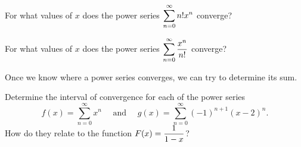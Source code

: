 \newpage

\begin{example}
For what values of $x$ does the power series $\displaystyle\sum_{n=0}^\infty n!x^n$ converge?
\end{example}

\ifdefined\SOLUTION
{}
\fi

\newpage

\begin{example}
For what values of $x$ does the power series $\displaystyle\sum_{n=0}^\infty \frac{x^n}{n!}$ converge?
\end{example}

\ifdefined\SOLUTION
{}
\fi
\newpage

\begin{remark}
Once we know where a power series converges, we can try to determine its sum.
\end{remark}

\begin{example}
Determine the interval of convergence for each of the power series
\begin{equation*}
f(x) = \sum_{n=0}^\infty x^n\quad\text{ and }\quad g(x) =\sum_{n=0}^\infty (-1)^{n+1}(x-2)^n.
\end{equation*}
How do they relate to the function $F(x)=\displaystyle\frac{1}{1-x}$?
\end{example}

